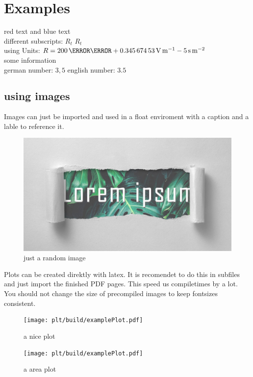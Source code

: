 \documentclass[	%
		11pt,a4paper,	%
		twoside,		%
		english,		%
		f1				%
	]{HsH-report}		%
\begin{document}
\maketitle				%
\declarationAuthorship

\begin{abstract}
	\lipsum[5-8]
\end{abstract}

\tableofcontents

\cleardoublepage %

\chapter{Examples}
	\label{chap: one}
	{\color{red}red text} and {\color{blue}blue text} \\
	different subscripts: \normalsubscripts$R_t$ \upsubscripts$R_t$ \\
	using Units: $R=200\,\milli\ohm + \SI{0.34567453}{\volt\per\metre} - 5\,\si{\second\per\metre\squared}$ \\
	some information\cite{laboranleitung:physik}\\
	german number: $3,5$ english number: $3.5$\\

	\section{using images}
	Images can just be imported and used in a float enviroment with a caption and a lable to reference it.
	\begin{figure}
		\includegraphics[width=.6\textwidth]{img/lorem-ipsum.jpg}
		\caption{just a random image}
	\end{figure}

	Plots can be created direktly with latex. It is recomendet to do this in subfiles and just import the finished PDF pages. This speed us
	compiletimes by a lot. You should not change the size of precompiled images to keep fontsizes consistent.
	\pagebreak
	\begin{figure}
		\texttt{[image: plt/build/examplePlot.pdf]}
		\caption[centering]{a nice plot}
		\label{fig: plot1}
	\end{figure}
	\begin{figure}
		\texttt{[image: plt/build/examplePlot.pdf]}
		\caption{a area plot}
		\label{fig: area}
	\end{figure}
\end{document}
